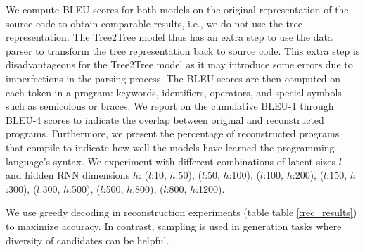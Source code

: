 We compute BLEU scores \cite{papineni2002bleu} for both models on the original representation of the source code to obtain comparable results, i.e., we do not use the tree representation. The Tree2Tree model thus has an extra step to use the data parser to transform the tree representation back to source code. This extra step is disadvantageous for the Tree2Tree model as it may introduce some errors due to imperfections in the parsing process. The BLEU scores are then computed on each token in a program: keywords, identifiers, operators, and special symbols such as semicolons or braces. We report on the cumulative BLEU-1 through BLEU-4 scores to indicate the overlap between original and reconstructed programs. Furthermore, we present the percentage of reconstructed programs that compile to indicate how well the models have learned the programming language's syntax. We experiment with different combinations of latent sizes $l$ and hidden RNN dimensions $h$:  ($l$:10,  $h$:50), ($l$:50, $h$:100), ($l$:100, $h$:200), ($l$:150, $h$:300), ($l$:300, $h$:500), ($l$:500, $h$:800), ($l$:800, $h$:1200).



We use greedy decoding in reconstruction experiments (table table \ref{:rec_results}) to maximize accuracy. In contrast, sampling is used in generation tasks where diversity of candidates can be helpful.

